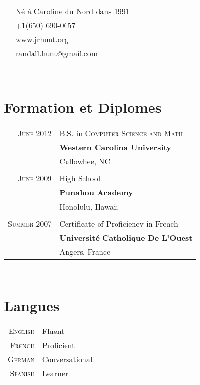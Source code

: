 \documentclass[10pt]{article}
\begin{document}
\hfill
\begin{minipage}[t]{0.44\textwidth} %

   \vspace{0pt} %

\colorbox{shade}{\textcolor{text1}{
      \begin{tabular}{c|p{7cm}}
                                    & Né à Caroline du Nord dans 1991\\
         \raisebox{-3pt}{\Phone}    &+1(650) 690-0657\\
         \raisebox{-1pt}{\textsc{www}} &\href{http://www.jrhunt.org/}{www.jrhunt.org}\\
         \raisebox{-3pt}{\Envelope} &\href{mailto:randall.hunt@gmail.com}{randall.hunt@gmail.com}
      \end{tabular}
}
}\\[3pt]
\section{Formation et Diplomes}

\begin{tabular}{rl}

   \textsc{June} 2012 & B.S. in \textsc{Computer Science and Math}\\
      & \textbf{Western Carolina University}\\
      & Cullowhee, NC\\
      &\\
   \textsc{June} 2009 & High School\\
      & \textbf{Punahou Academy}\\
      & Honolulu, Hawaii\\
      &\\
   \textsc{Summer} 2007 & Certificate of Proficiency in French\\
      & \textbf{Université Catholique De L'Ouest}\\
      & Angers, France\\
\end{tabular}\\[5pt]

\section{Langues}

\begin{tabular}{rl}
   \textsc{English}  &  Fluent\\
   \textsc{French}   &  Proficient\\
   \textsc{German}   &  Conversational\\
   \textsc{Spanish}  &  Learner\\
\end{tabular}\\[5pt]


\end{minipage}
\end{document}
